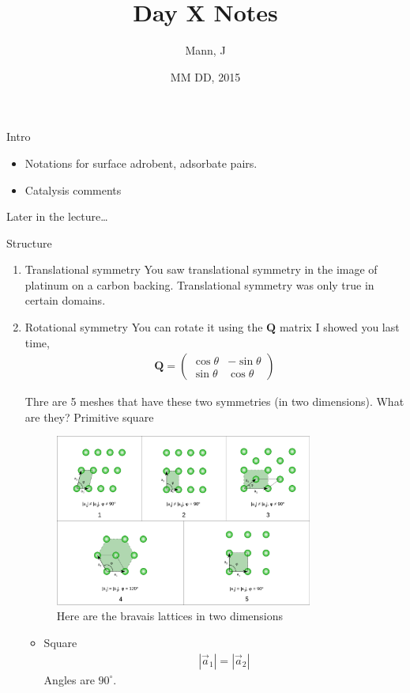 \documentclass{article}
\author{Mann, J}
\title{Day X Notes}
\date{MM DD, 2015}
\newcommand{\matr}[1]{\bm{#1}}
\newcommand{\norm}[1]{\left|#1\right|}
\newcommand{\aone}[0]{\vec{a}_1}
\newcommand{\atwo}[0]{\vec{a}_2}
\newcommand{\pmat}[1]{\begin{pmatrix}#1\end{pmatrix}}
\begin{document}
\maketitle{}
\begin{section}{Intro}
	\begin{itemize}
		\item Notations for surface adrobent, adsorbate pairs.
		\item Catalysis comments
	\end{itemize}
	Later in the lecture\dots
\end{section}
\begin{section}{Structure}
	\begin{enumerate}
		\item 	Translational symmetry
			You saw translational symmetry in the image of platinum on a carbon backing. Translational symmetry was only true in certain domains.

		\item Rotational symmetry
			You can rotate it using the $\matr{Q}$ matrix I showed you last time,
			\begin{align*}
				\matr{Q} = \pmat{\cos\theta & -\sin\theta\\\sin\theta & \cos\theta}
			\end{align*}

			Thre are 5 meshes that have these two symmetries (in two dimensions).
			What are they?
			Primitive square
			\begin{figure}[h]
				\centering
				\includegraphics[height=160pt]{bravaislattices}
				\caption{Here are the bravais lattices in two dimensions}
				\label{fig:bravais}
			\end{figure}

			\begin{itemize}
				\item Square
					\begin{align*}
						\norm{\aone} = \norm{\atwo}
					\end{align*}
					Angles are $90^\circ$.



\end{itemize}
\end{enumerate}
\end{section}
\end{document}
